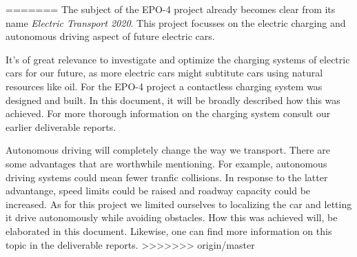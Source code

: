 \documentclass[11pt,titlepage]{report}
\begin{document}
  


=======
The subject of the EPO-4 project already becomes clear from its name \textit{Electric Transport 2020}. This project focusses on the electric charging and autonomous driving aspect of future electric cars.

It's of great relevance to investigate and optimize the charging systems of electric cars for our future, as more electric cars might subtitute cars using natural resources like oil. For the EPO-4 project a contactless charging system was designed and built. In this document, it will be broadly described how this was achieved. For more thorough information on the charging system consult our earlier deliverable reports. 

Autonomous driving will completely change the way we transport. There are some advantages that are worthwhile mentioning. For example, autonomous driving systems could mean fewer tranfic collisions. In response to the latter advantange, speed limits could be raised and roadway capacity could be increased. As for this project we limited ourselves to localizing the car and letting it drive autonomously while avoiding obstacles. How this was achieved will, be elaborated in this document. Likewise, one can find more information on this topic in the deliverable reports. 
>>>>>>> origin/master
\end{document}
